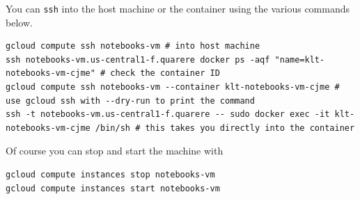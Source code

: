 \documentclass[11pt]{article}
\begin{document}
\begin{enumerate}
You can \texttt{ssh} into the host machine or the container using the various commands below.

\begin{verbatim}
gcloud compute ssh notebooks-vm # into host machine
ssh notebooks-vm.us-central1-f.quarere docker ps -aqf "name=klt-notebooks-vm-cjme" # check the container ID
gcloud compute ssh notebooks-vm --container klt-notebooks-vm-cjme # use gcloud ssh with --dry-run to print the command
ssh -t notebooks-vm.us-central1-f.quarere -- sudo docker exec -it klt-notebooks-vm-cjme /bin/sh # this takes you directly into the container
\end{verbatim}

Of course you can stop and start the machine with

\begin{verbatim}
gcloud compute instances stop notebooks-vm
gcloud compute instances start notebooks-vm
\end{verbatim}
\end{enumerate}
\end{document}
